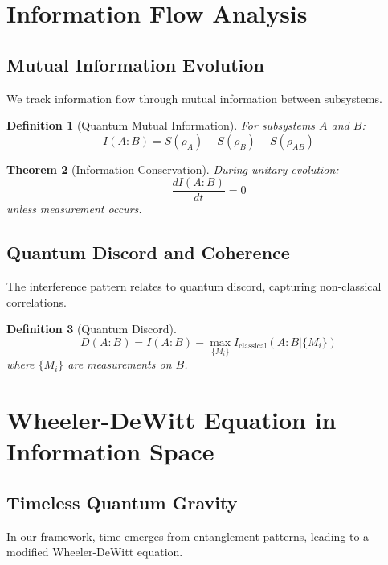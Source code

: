 \documentclass[12pt,a4paper]{article}
\newtheorem{theorem}{Theorem}[section]
\newtheorem{definition}[theorem]{Definition}
\begin{document}
\section{Information Flow Analysis}

\subsection{Mutual Information Evolution}

We track information flow through mutual information between subsystems.

\begin{definition}[Quantum Mutual Information]
For subsystems $A$ and $B$:
\begin{equation}
I(A:B) = S(\rho_A) + S(\rho_B) - S(\rho_{AB})
\end{equation}
\end{definition}

\begin{theorem}[Information Conservation]
During unitary evolution:
\begin{equation}
\frac{dI(A:B)}{dt} = 0
\end{equation}
unless measurement occurs.
\end{theorem}

\subsection{Quantum Discord and Coherence}

The interference pattern relates to quantum discord, capturing non-classical correlations.

\begin{definition}[Quantum Discord]
\begin{equation}
D(A:B) = I(A:B) - \max_{\{M_i\}} I_{\text{classical}}(A:B|\{M_i\})
\end{equation}
where $\{M_i\}$ are measurements on $B$.
\end{definition}

\section{Wheeler-DeWitt Equation in Information Space}

\subsection{Timeless Quantum Gravity}

In our framework, time emerges from entanglement patterns, leading to a modified Wheeler-DeWitt equation.
\end{document}
